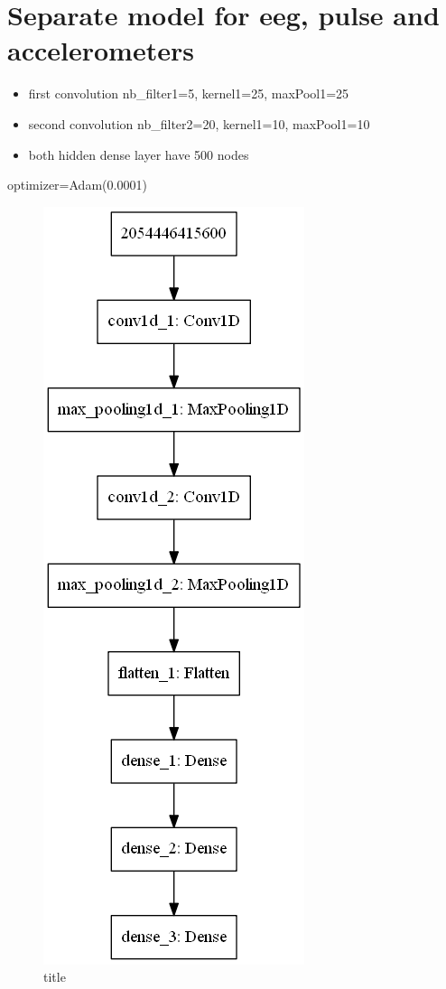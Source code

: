 \documentclass[11pt]{article}
\makeatletter
\def\maxwidth{\ifdim\Gin@nat@width>\linewidth\linewidth
    \else\Gin@nat@width\fi}
\let\Oldincludegraphics\includegraphics
\renewcommand{\includegraphics}[1]{\Oldincludegraphics[width=.8\maxwidth]{#1}}
\providecommand{\tightlist}{%
      \setlength{\itemsep}{0pt}\setlength{\parskip}{0pt}}
\makeatother
\begin{document}
    \section{Separate model for eeg, pulse and
accelerometers}\label{separate-model-for-eeg-pulse-and-accelerometers}

\begin{itemize}
\tightlist
\item
  first convolution nb\_filter1=5, kernel1=25, maxPool1=25
\item
  second convolution nb\_filter2=20, kernel1=10, maxPool1=10
\item
  both hidden dense layer have 500 nodes
\end{itemize}

optimizer=Adam(0.0001)

\begin{figure}
\centering
\includegraphics{conv1 eeg.png}
\caption{title}
\end{figure}
\end{document}
